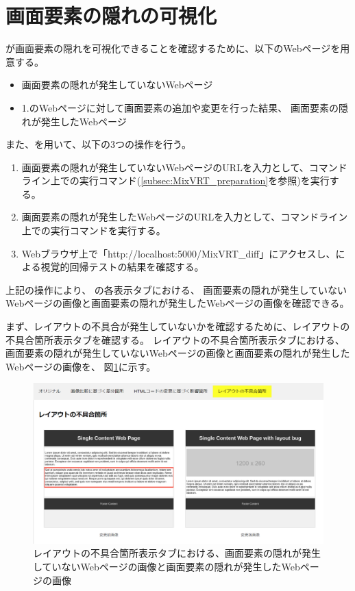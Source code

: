 \section{画面要素の隠れの可視化}\label{sec:result_area_detection}
\toolName が画面要素の隠れを可視化できることを確認するために、以下のWebページを用意する。
\begin{itemize}
    \setlength{\itemsep}{0pt}
          \setlength{\parsep}{0pt}
    \item 画面要素の隠れが発生していないWebページ\label{item: ex1_bf}
    \item 1.のWebページに対して画面要素の追加や変更を行った結果、
          画面要素の隠れが発生したWebページ\label{item: ex1_af}
\end{itemize}
また、\toolName を用いて、以下の3つの操作を行う。
\begin{enumerate}[label=操作\arabic*., leftmargin=1.8cm]
    \item 画面要素の隠れが発生していないWebページのURLを入力として、コマンドライン上で\toolName の実行コマンド(\ref{subsec:MixVRT_preparation}を参照)を実行する。
    \item 画面要素の隠れが発生したWebページのURLを入力として、コマンドライン上で\toolName の実行コマンドを実行する。
    \item Webブラウザ上で「http://localhost:5000/MixVRT\_diff」にアクセスし、\toolName による視覚的回帰テストの結果を確認する。
\end{enumerate}
\par
上記の操作により、
\toolName の各表示タブにおける、
画面要素の隠れが発生していないWebページの画像と画面要素の隠れが発生したWebページの画像を確認できる。
\par
まず、レイアウトの不具合が発生していないかを確認するために、レイアウトの不具合箇所表示タブを確認する。
レイアウトの不具合箇所表示タブにおける、画面要素の隠れが発生していないWebページの画像と画面要素の隠れが発生したWebページの画像を、
図\ref{fig: ex1_subeffect}に示す。
\begin{figure}[tp]
    \begin{center}
        \includegraphics[width=1.0\columnwidth]{image/5/ex1_subeffect.png}
        \caption{レイアウトの不具合箇所表示タブにおける、画面要素の隠れが発生していないWebページの画像と画面要素の隠れが発生したWebページの画像}
        \label{fig: ex1_subeffect}
    \end{center}
\end{figure}
